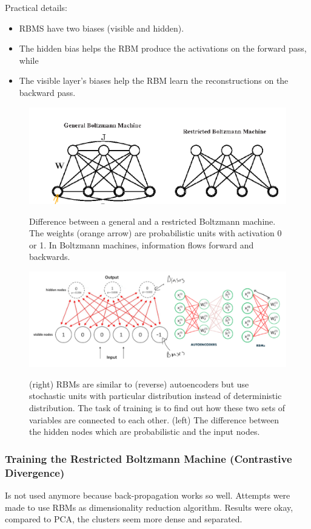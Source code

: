 \documentclass[main]{subfiles}
\begin{document}
Practical details:
\begin{itemize}
    \item RBMS have two biases (visible and hidden).
    \item The hidden bias helps the RBM produce the activations on the forward pass, while
    \item The visible layer’s biases help the RBM learn the reconstructions on the backward pass.
\end{itemize}

\begin{figure}[H]
	\centering
	\includegraphics[width=0.9\linewidth]{07_UnsupervisedAndSelfsupervisedLearning/figures/boltzmann-res-ures.png}
	\label{fig:boltzmann-res-ures}
	\caption{Difference between a general and a restricted Boltzmann machine. The weights (orange arrow) are probabilistic units with activation 0 or 1. In Boltzmann machines, information flows forward and backwards.}
\end{figure}
\begin{figure}[H]
	\centering
	\includegraphics[width=0.9\linewidth]{07_UnsupervisedAndSelfsupervisedLearning/figures/boltzmann-in-action.png}
	\label{fig:boltzmann-in-action}
	\caption{(right) RBMs are similar to (reverse) autoencoders but use stochastic units with particular distribution instead of deterministic distribution. The task of training is to find out how these two sets of variables are connected to each other. (left) The difference between the hidden nodes which are probabilistic and the input nodes.}
\end{figure}

\subsubsection{Training the Restricted Boltzmann Machine (Contrastive Divergence)}
Is not used anymore because back-propagation works so well. Attempts were made to use RBMs as dimensionality reduction algorithm. Results were okay, compared to PCA, the clusters seem more dense and separated.
\end{document}
